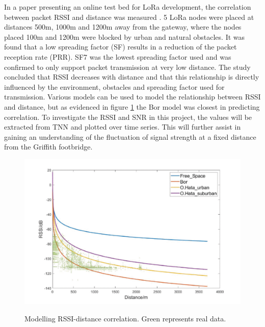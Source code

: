 In a paper presenting an online test bed for LoRa development, the correlation between packet RSSI and distance was measured \cite{Dandelion-Testbed}. 5 LoRa nodes were placed at distances 500m, 1000m and 1200m away from the gateway, where the nodes placed 100m and 1200m were blocked by urban and natural obstacles. It was found that a low spreading factor (SF) results in a reduction of the packet reception rate (PRR). SF7 was the lowest spreading factor used and was confirmed to only support packet transmission at very low distance. The study concluded that RSSI decreases with distance and that this relationship is directly influenced by the environment, obstacles and spreading factor used for transmission. Various models can be used to model the relationship between RSSI and distance, but as evidenced in figure \ref{rssi-distance-model} the Bor model was closest in predicting correlation. To investigate the RSSI and SNR in this project, the values will be extracted from TNN and plotted over time series. This will further assist in gaining an understanding of the fluctuation of signal strength at a fixed distance from the Griffith footbridge. 

\begin{figure}[h]
	\centering
	\caption{Modelling RSSI-distance correlation. Green represents real data. \cite{Dandelion-Testbed}}
	\includegraphics[scale=0.5]{Sections/Literature-Review/rssi-distance-model.pdf}
	\label{rssi-distance-model}
\end{figure}

